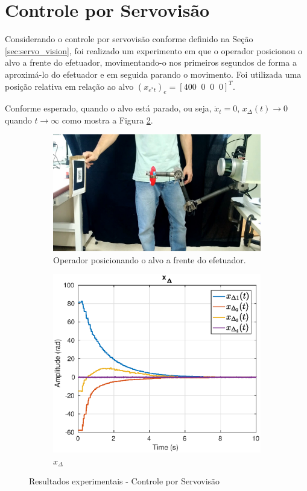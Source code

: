 \section{Controle por Servovisão}

Considerando o controle por servovisão conforme definido na Seção \ref{sec:servo_vision}, foi realizado um experimento em que o operador posicionou o alvo a frente do efetuador, movimentando-o nos primeiros segundos de forma a aproximá-lo do efetuador e em seguida parando o movimento. Foi utilizada uma posição relativa em relação ao alvo $({x}_{e^*t})_e = [400 \;\; 0 \;\; 0 \;\; 0]^T$.


Conforme esperado, quando o alvo está parado, ou seja, $\dot{{x}}_t = 0$, ${x_\Delta}(t) \rightarrow 0$ quando $t \rightarrow \infty$ como mostra a Figura \ref{fig:xdelta}.

\begin{figure}[H]
\centering
\begin{subfigure}{.45\textwidth}
  \centering
  \includegraphics[width=\linewidth]{./img/mpv-shot0001.jpg}
  \caption{Operador posicionando o alvo a frente do efetuador.}
  \label{fig:sub1}
\end{subfigure}%
\begin{subfigure}{.4\textwidth}
  \centering
  \includegraphics[width=\linewidth]{./img/x_delta.eps}
  \caption{$x_\Delta$}
  \label{fig:xdelta}
\end{subfigure}
\caption{Resultados experimentais - Controle por Servovisão}
\label{fig:vision_exp}
\end{figure}
